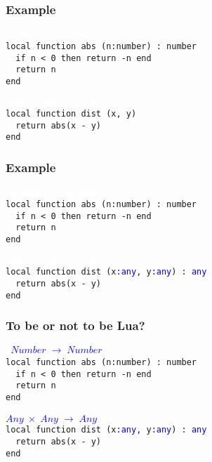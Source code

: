 \documentclass{beamer}
\begin{document}
\begin{frame}
\frametitle{Example}
{\tt
\textcolor{white}{$Number \;\rightarrow\; Number$}\\
local function abs (n:number) : number\\
\textcolor{white}{--} if n < 0 then return -n end\\
\textcolor{white}{--} return n\\
end\\
\textcolor{white}{--}\\
\textcolor{white}{$Any \;\times\; Any \;\rightarrow\; Any$}\\
local function dist (x, y)\\
\textcolor{white}{--} return abs(x - y)\\
end\\
}
\end{frame}

\begin{frame}
\frametitle{Example}
{\tt
\textcolor{white}{$Number \;\rightarrow\; Number$}\\
local function abs (n:number) : number\\
\textcolor{white}{--} if n < 0 then return -n end\\
\textcolor{white}{--} return n\\
end\\
\textcolor{white}{--}\\
\textcolor{white}{$Any \;\times\; Any \;\rightarrow\; Any$}\\
local function dist (x\textcolor{blue}{:any}, y\textcolor{blue}{:any}) \textcolor{blue}{: any}\\
\textcolor{white}{--} return abs(x - y)\\
end\\
}
\end{frame}

\begin{frame}
\frametitle{To be or not to be Lua?}
{\tt
\textcolor{blue}{$Number \;\rightarrow\; Number$}\\
local function abs (n:number) : number\\
\textcolor{white}{--} if n < 0 then return -n end\\
\textcolor{white}{--} return n\\
end\\
\textcolor{white}{--}\\
\textcolor{blue}{$Any \;\times\; Any \;\rightarrow\; Any$}\\
local function dist (x\textcolor{blue}{:any}, y\textcolor{blue}{:any}) \textcolor{blue}{: any}\\
\textcolor{white}{--} return abs(x - y)\\
end\\
}
\end{frame}
\end{document}
